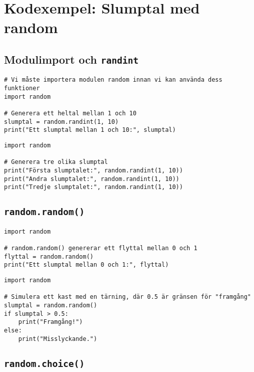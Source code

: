 \section{Kodexempel: Slumptal med random}
\label{examples:random}
\subsection*{Modulimport och \texttt{randint}}

\begin{lstlisting}[title=Exempel 1: Importera modulen \texttt{random}]
# Vi måste importera modulen random innan vi kan använda dess funktioner
import random

# Generera ett heltal mellan 1 och 10
slumptal = random.randint(1, 10)
print("Ett slumptal mellan 1 och 10:", slumptal)
\end{lstlisting}

\begin{lstlisting}[title=Exempel 2: Generera flera slumptal]
import random

# Generera tre olika slumptal
print("Första slumptalet:", random.randint(1, 10))
print("Andra slumptalet:", random.randint(1, 10))
print("Tredje slumptalet:", random.randint(1, 10))
\end{lstlisting}

\subsection*{\texttt{random.random()}}

\begin{lstlisting}[title=Exempel 3: Generera ett flyttal mellan 0 och 1]
import random

# random.random() genererar ett flyttal mellan 0 och 1
flyttal = random.random()
print("Ett slumptal mellan 0 och 1:", flyttal)
\end{lstlisting}

\begin{lstlisting}[title=Exempel 4: Använd slumptal för simulering]
import random

# Simulera ett kast med en tärning, där 0.5 är gränsen för "framgång"
slumptal = random.random()
if slumptal > 0.5:
    print("Framgång!")
else:
    print("Misslyckande.")
\end{lstlisting}

\subsection*{\texttt{random.choice()}}

